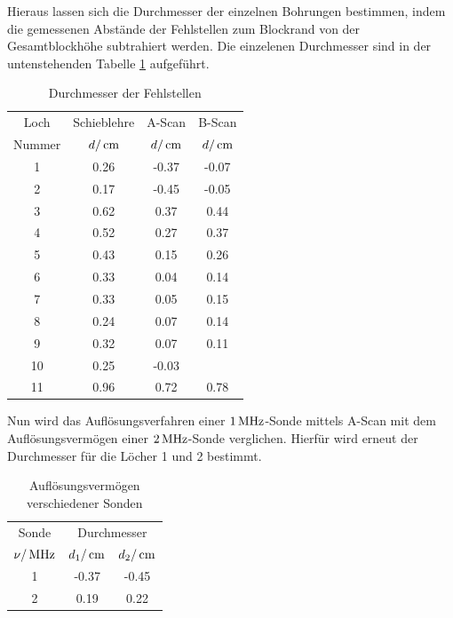 Hieraus lassen sich die Durchmesser der einzelnen Bohrungen bestimmen, indem
die gemessenen Abstände der Fehlstellen zum Blockrand von der Gesamtblockhöhe
subtrahiert werden. Die einzelenen Durchmesser sind in der untenstehenden
Tabelle \ref{tab:durch} aufgeführt.
\begin{table}[H]
  \centering
  \begin{tabular}{cccc}
    \toprule
    \multicolumn{1}{c}{Loch}&\multicolumn{1}{c}{Schieblehre}&
    \multicolumn{1}{c}{A-Scan}&\multicolumn{1}{c}{B-Scan} \\
    Nummer & $d/\,\si{\centi\meter}$ & $d/\,\si{\centi\meter}$ & $d/\,\si{\centi\meter}$ \\
    \midrule
     1 & 0.26 & -0.37  &  -0.07      \\
     2 & 0.17 & -0.45  &  -0.05      \\
     3 & 0.62 &  0.37  &   0.44      \\
     4 & 0.52 &  0.27  &   0.37      \\
     5 & 0.43 &  0.15  &   0.26      \\
     6 & 0.33 &  0.04  &   0.14      \\
     7 & 0.33 &  0.05  &   0.15      \\
     8 & 0.24 &  0.07  &   0.14      \\
     9 & 0.32 &  0.07  &   0.11      \\
    10 & 0.25 & -0.03  &  \hrulefill \\
    11 & 0.96 &  0.72  &   0.78      \\
    \bottomrule
  \end{tabular}
  \caption{Durchmesser der Fehlstellen}
  \label{tab:durch}
\end{table}
Nun wird das Auflösungsverfahren einer $1\,\si{\mega\hertz}$-Sonde mittels A-Scan mit dem
Auflösungsvermögen einer $2\,\si{\mega\hertz}$-Sonde verglichen. Hierfür wird erneut der
Durchmesser für die Löcher 1 und 2 bestimmt.
\begin{table}[H]
  \centering
  \begin{tabular}{ccc}
    \toprule
    \multicolumn{1}{c}{Sonde}&\multicolumn{2}{c}{Durchmesser}\\
    $\nu/\,\si{\mega\hertz}$ & $d_1/\,\si{\centi\meter}$ & $d_2/\,\si{\centi\meter}$ \\
    \midrule
    1  &  -0.37  &  -0.45 \\
    2  &   0.19  &   0.22 \\
    \bottomrule
  \end{tabular}
  \caption{Auflösungsvermögen verschiedener Sonden}
  \label{tab:auf}
\end{table}
